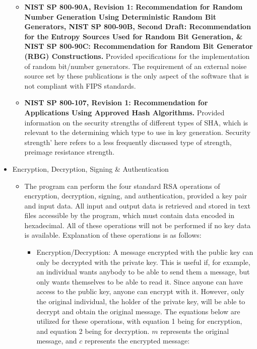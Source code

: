 \documentclass[11pt]{article}
\begin{document}
\begin{itemize}
{\begin{itemize}
{\begin{itemize}
{\begin{itemize}
			{
			\textbf{NIST SP 800-57 Part 1, Revision 4: Recommendation for Key Management.} Provided information on security strengths of various key sizes of RSA, which is used to determine which types of SHA are approved for use with each key size. `Security strength' here refers to the type of security most frequently relevant to RSA, collision resistance strength. 
			}
			\item
			{
			\textbf{NIST SP 800-90A, Revision 1: Recommendation for Random Number Generation Using Deterministic Random Bit Generators, NIST SP 800-90B, Second Draft: Recommendation for the Entropy Sources Used for Random Bit Generation, \& NIST SP 800-90C: Recommendation for Random Bit Generator (RBG) Constructions.} Provided specifications for the implementation of random bit/number generators. The requirement of an external noise source set by these publications is the only aspect of the software that is not compliant with FIPS standards.
			}
			\item
			{
			\textbf{NIST SP 800-107, Revision 1: Recommendation for Applications Using Approved Hash Algorithms.} Provided information on the security strengths of different types of SHA, which is relevant to the determining which type to use in key generation. Security strength' here refers to a less frequently discussed type of strength, preimage resistance strength.
			}
			
			\end{itemize}
		}
		\end{itemize}
	}
	\end{itemize}
}
\item
{Encryption, Decryption, Signing \& Authentication
	\begin{itemize}
	\item
	{The program can perform the four standard RSA operations of encryption, decryption, signing, and authentication, provided a key pair and input data. All input and output data is retrieved and stored in text files accessible by the program, which must contain data encoded in hexadecimal. All of these operations will not be performed if no key data is available. Explanation of these operations is as follows:
		\begin{itemize}
		\item
		{
		Encryption/Decryption: A message encrypted with the public key can only be decrypted with the private key. This is useful if, for example, an individual wants anybody to be able to send them a message, but only wants themselves to be able to read it. Since anyone can have access to the public key, anyone can encrypt with it. However, only the original individual, the holder of the private key, will be able to decrypt and obtain the original message. The equations below are utilized for these operations, with equation 1 being for encryption, and equation 2 being for decryption. $m$ represents the original message, and $c$ represents the encrypted message:\newline

}
\end{itemize}}
\end{itemize}}
\end{itemize}
\end{document}
